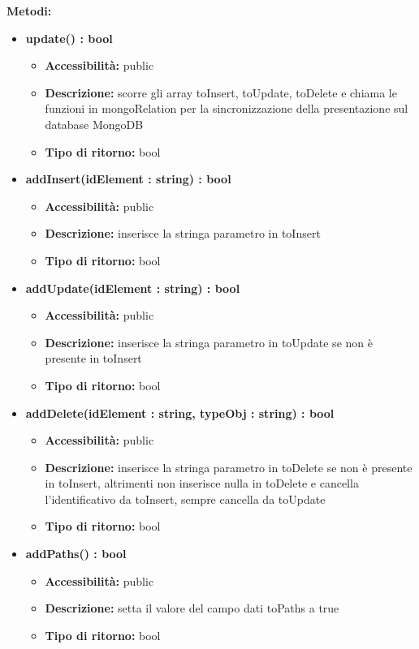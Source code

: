 {{\begin{itemize}
			\end{itemize}
	
		\textbf{Metodi:}
			\begin{itemize}
			\item \textbf{update() : bool}
				\begin{itemize}
				\item \textbf{Accessibilit\`{a}:} public
				\item \textbf{Descrizione:} scorre gli array toInsert, toUpdate, toDelete e chiama le funzioni in mongoRelation per la sincronizzazione della presentazione sul database MongoDB
				\item \textbf{Tipo di ritorno:} bool
				\end{itemize}
			\item \textbf{addInsert(idElement : string) : bool}
				\begin{itemize}
				\item \textbf{Accessibilit\`{a}:} public
				\item \textbf{Descrizione:} inserisce la stringa parametro in toInsert
				\item \textbf{Tipo di ritorno:} bool
				\end{itemize}
			\item \textbf{addUpdate(idElement : string) : bool}
				\begin{itemize}
				\item \textbf{Accessibilit\`{a}:} public
				\item \textbf{Descrizione:} inserisce la stringa parametro in toUpdate se non \`{e} presente in toInsert
				\item \textbf{Tipo di ritorno:} bool
				\end{itemize}
			\item \textbf{addDelete(idElement : string, typeObj : string) : bool}
				\begin{itemize}
				\item \textbf{Accessibilit\`{a}:} public
				\item \textbf{Descrizione:} inserisce la stringa parametro in toDelete se non \`{e} presente in toInsert, altrimenti non inserisce nulla in toDelete e cancella l'identificativo da toInsert, sempre cancella da toUpdate
				\item \textbf{Tipo di ritorno:} bool
				\end{itemize}
			\item \textbf{addPaths() : bool}
				\begin{itemize}
				\item \textbf{Accessibilit\`{a}:} public
				\item \textbf{Descrizione:} setta il valore del campo dati toPaths a true
				\item \textbf{Tipo di ritorno:} bool
				\end{itemize}


			\end{itemize}
	}
 }
	
	
	
	
	
	
	
	
	
	